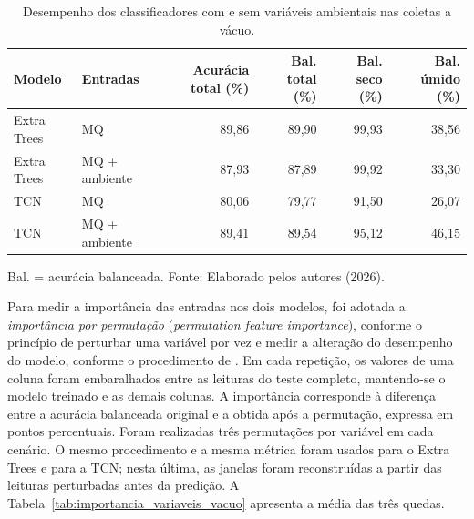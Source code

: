 \begin{table}[htbp]
    \centering
    \caption{Desempenho dos classificadores com e sem variáveis ambientais nas coletas a vácuo.}
    \label{tab:ablacao_ambiente_vacuo}
    \scriptsize
    \begin{tabular}{llrrrr}
        \hline
        \textbf{Modelo} & \textbf{Entradas} &
        \textbf{Acurácia total (\%)} &
        \textbf{Bal. total (\%)} &
        \textbf{Bal. seco (\%)} &
        \textbf{Bal. úmido (\%)} \\
        \hline
        Extra Trees & MQ              & 89,86 & 89,90 & 99,93 & 38,56 \\
        Extra Trees & MQ + ambiente   & 87,93 & 87,89 & 99,92 & 33,30 \\
        TCN         & MQ              & 80,06 & 79,77 & 91,50 & 26,07 \\
        TCN         & MQ + ambiente   & 89,41 & 89,54 & 95,12 & 46,15 \\
        \hline
    \end{tabular}

    \vspace{0.1cm}
    {\footnotesize Bal. = acurácia balanceada. Fonte: Elaborado pelos autores (2026).}
\end{table}

Para medir a importância das entradas nos dois modelos, foi adotada a
\emph{importância por permutação} (\emph{permutation feature importance}),
conforme o princípio de perturbar uma variável por vez e medir a alteração do
desempenho do modelo, conforme o procedimento de \cite{fisher2019modelreliance}.
Em cada repetição, os
valores de uma coluna foram embaralhados entre as leituras do teste completo,
mantendo-se o modelo treinado e as demais colunas. A importância corresponde à
diferença entre a acurácia balanceada original e a obtida após a permutação,
expressa em pontos percentuais. Foram realizadas três permutações por variável
em cada cenário. O mesmo procedimento e a mesma métrica foram usados para o
Extra Trees e para a TCN; nesta última, as janelas foram reconstruídas a
partir das leituras perturbadas antes da predição. A
Tabela~\ref{tab:importancia_variaveis_vacuo} apresenta a média das três quedas.

